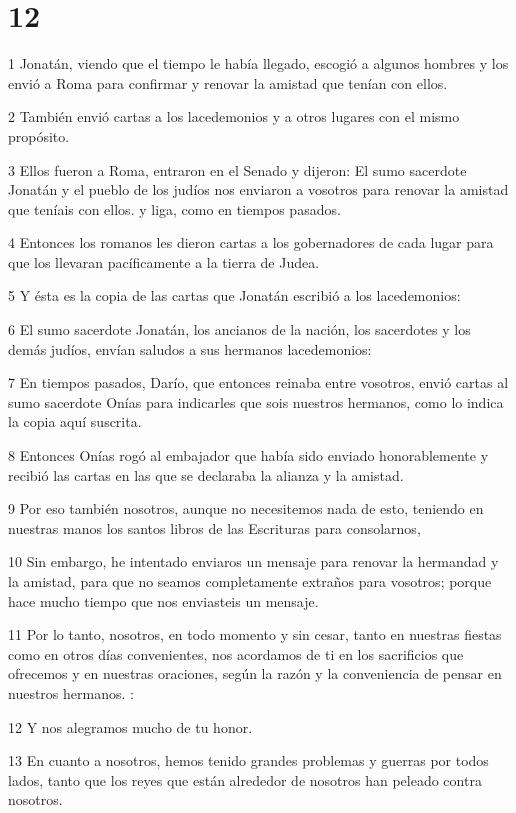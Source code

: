 \chapter{12}

\par 1 Jonatán, viendo que el tiempo le había llegado, escogió a algunos hombres y los envió a Roma para confirmar y renovar la amistad que tenían con ellos.
\par 2 También envió cartas a los lacedemonios y a otros lugares con el mismo propósito.
\par 3 Ellos fueron a Roma, entraron en el Senado y dijeron: El sumo sacerdote Jonatán y el pueblo de los judíos nos enviaron a vosotros para renovar la amistad que teníais con ellos. y liga, como en tiempos pasados.
\par 4 Entonces los romanos les dieron cartas a los gobernadores de cada lugar para que los llevaran pacíficamente a la tierra de Judea.
\par 5 Y ésta es la copia de las cartas que Jonatán escribió a los lacedemonios:
\par 6 El sumo sacerdote Jonatán, los ancianos de la nación, los sacerdotes y los demás judíos, envían saludos a sus hermanos lacedemonios:
\par 7 En tiempos pasados, Darío, que entonces reinaba entre vosotros, envió cartas al sumo sacerdote Onías para indicarles que sois nuestros hermanos, como lo indica la copia aquí suscrita.
\par 8 Entonces Onías rogó al embajador que había sido enviado honorablemente y recibió las cartas en las que se declaraba la alianza y la amistad.
\par 9 Por eso también nosotros, aunque no necesitemos nada de esto, teniendo en nuestras manos los santos libros de las Escrituras para consolarnos,
\par 10 Sin embargo, he intentado enviaros un mensaje para renovar la hermandad y la amistad, para que no seamos completamente extraños para vosotros; porque hace mucho tiempo que nos enviasteis un mensaje.
\par 11 Por lo tanto, nosotros, en todo momento y sin cesar, tanto en nuestras fiestas como en otros días convenientes, nos acordamos de ti en los sacrificios que ofrecemos y en nuestras oraciones, según la razón y la conveniencia de pensar en nuestros hermanos. :
\par 12 Y nos alegramos mucho de tu honor.
\par 13 En cuanto a nosotros, hemos tenido grandes problemas y guerras por todos lados, tanto que los reyes que están alrededor de nosotros han peleado contra nosotros.
